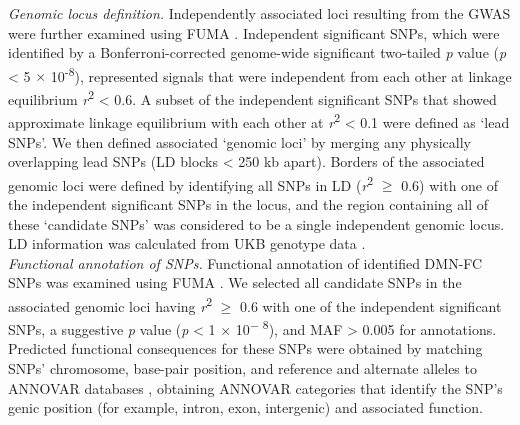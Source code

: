 \begin{refsection}
\noindent
\textit{Genomic locus definition. }Independently associated loci resulting from the GWAS were further examined using FUMA \citep{watanabe2017functional}. Independent significant SNPs, which were identified by a Bonferroni-corrected genome-wide significant two-tailed \textit{p} value (\textit{p} < 5 $ \times $ 10\textsuperscript{-8}), represented signals that were independent from each other at linkage equilibrium \textit{r}\textsuperscript{2} < 0.6. A subset of the independent significant SNPs that showed approximate linkage equilibrium with each other at \textit{r}\textsuperscript{2} < 0.1 were defined as ‘lead SNPs’. We then defined associated ‘genomic loci’ by merging any physically overlapping lead SNPs (LD blocks < 250 kb apart). Borders of the associated genomic loci were defined by identifying all SNPs in LD (\textit{r}\textsuperscript{2} $ \geq $  0.6) with one of the independent significant SNPs in the locus, and the region containing all of these ‘candidate SNPs’ was considered to be a single independent genomic locus. LD information was calculated from UKB genotype data  \citep{Savage2018GenomewideAM}.\\

\noindent
\textit{Functional annotation of SNPs.} Functional annotation of identified DMN-FC SNPs was examined using FUMA \citep{watanabe2017functional}. We selected all candidate SNPs in the associated genomic loci having \textit{r}\textsuperscript{2} $ \geq $  0.6 with one of the independent significant SNPs, a suggestive \textit{p} value (\textit{p} < 1 $ \times $  10\textsuperscript{$-$ 8}), and MAF > 0.005 for annotations. Predicted functional consequences for these SNPs were obtained by matching SNPs’ chromosome, base-pair position, and reference and alternate alleles to ANNOVAR databases \citep{Wang2010ANNOVARFA}, obtaining ANNOVAR categories that identify the SNP’s genic position (for example, intron, exon, intergenic) and associated function.\\


\end{refsection}
